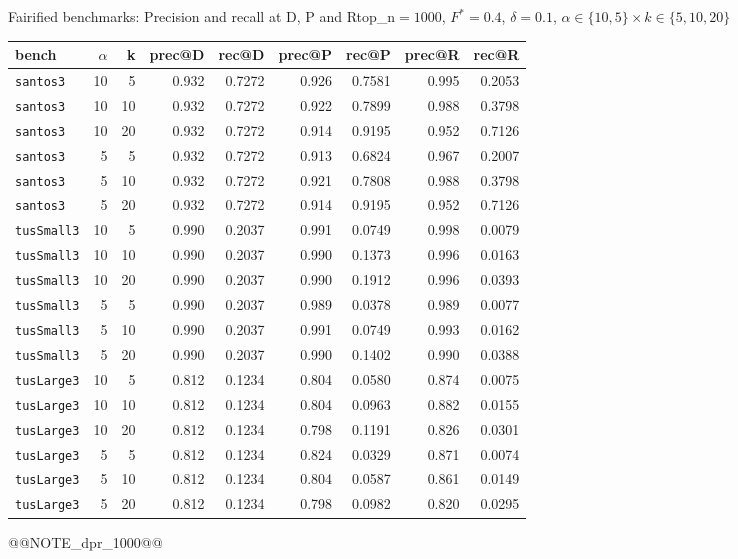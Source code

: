 \begin{frame}{Fairified benchmarks: Precision and recall at D, P and R}{top\_n$=1000$, $F^*{=}0.4$, $\delta{=}0.1$, $\alpha\in\{10,5\}\times k\in\{5,10,20\}$}
\tiny
\begin{center}
\setlength{\tabcolsep}{2.5pt}
\begin{tabular}{lrrrrrrrr}
\toprule
bench & $\alpha$ & k & prec@D & rec@D & prec@P & rec@P & prec@R & rec@R \\
\midrule
\texttt{santos3} & 10 & 5 & 0.932 & 0.7272 & 0.926 & 0.7581 & 0.995 & 0.2053 \\
\texttt{santos3} & 10 & 10 & 0.932 & 0.7272 & 0.922 & 0.7899 & 0.988 & 0.3798 \\
\texttt{santos3} & 10 & 20 & 0.932 & 0.7272 & 0.914 & 0.9195 & 0.952 & 0.7126 \\
\texttt{santos3} & 5 & 5 & 0.932 & 0.7272 & 0.913 & 0.6824 & 0.967 & 0.2007 \\
\texttt{santos3} & 5 & 10 & 0.932 & 0.7272 & 0.921 & 0.7808 & 0.988 & 0.3798 \\
\texttt{santos3} & 5 & 20 & 0.932 & 0.7272 & 0.914 & 0.9195 & 0.952 & 0.7126 \\
\texttt{tusSmall3} & 10 & 5 & 0.990 & 0.2037 & 0.991 & 0.0749 & 0.998 & 0.0079 \\
\texttt{tusSmall3} & 10 & 10 & 0.990 & 0.2037 & 0.990 & 0.1373 & 0.996 & 0.0163 \\
\texttt{tusSmall3} & 10 & 20 & 0.990 & 0.2037 & 0.990 & 0.1912 & 0.996 & 0.0393 \\
\texttt{tusSmall3} & 5 & 5 & 0.990 & 0.2037 & 0.989 & 0.0378 & 0.989 & 0.0077 \\
\texttt{tusSmall3} & 5 & 10 & 0.990 & 0.2037 & 0.991 & 0.0749 & 0.993 & 0.0162 \\
\texttt{tusSmall3} & 5 & 20 & 0.990 & 0.2037 & 0.990 & 0.1402 & 0.990 & 0.0388 \\
\texttt{tusLarge3} & 10 & 5 & 0.812 & 0.1234 & 0.804 & 0.0580 & 0.874 & 0.0075 \\
\texttt{tusLarge3} & 10 & 10 & 0.812 & 0.1234 & 0.804 & 0.0963 & 0.882 & 0.0155 \\
\texttt{tusLarge3} & 10 & 20 & 0.812 & 0.1234 & 0.798 & 0.1191 & 0.826 & 0.0301 \\
\texttt{tusLarge3} & 5 & 5 & 0.812 & 0.1234 & 0.824 & 0.0329 & 0.871 & 0.0074 \\
\texttt{tusLarge3} & 5 & 10 & 0.812 & 0.1234 & 0.804 & 0.0587 & 0.861 & 0.0149 \\
\texttt{tusLarge3} & 5 & 20 & 0.812 & 0.1234 & 0.798 & 0.0982 & 0.820 & 0.0295 \\
\bottomrule
\end{tabular}
\end{center}
@@NOTE_dpr_1000@@
\end{frame}

